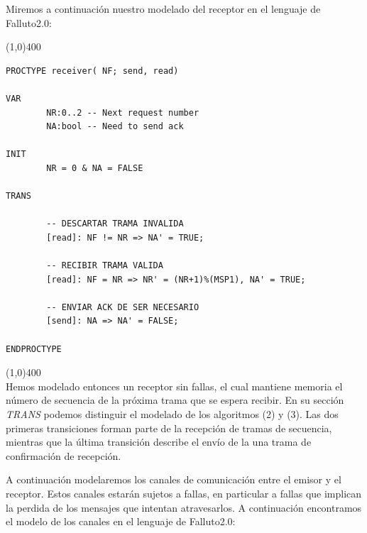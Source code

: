 \documentclass[titlepage, 12pt]{book}
\begin{document}
Miremos a continuaci\'on nuestro modelado del receptor en el lenguaje de Falluto2.0:

\noindent \line(1,0){400}
\begin{verbatim}
PROCTYPE receiver( NF; send, read)

VAR
        NR:0..2 -- Next request number
        NA:bool -- Need to send ack

INIT
        NR = 0 & NA = FALSE

TRANS

        -- DESCARTAR TRAMA INVALIDA
        [read]: NF != NR => NA' = TRUE;

        -- RECIBIR TRAMA VALIDA
        [read]: NF = NR => NR' = (NR+1)%(MSP1), NA' = TRUE;

        -- ENVIAR ACK DE SER NECESARIO
        [send]: NA => NA' = FALSE;

ENDPROCTYPE
\end{verbatim}
\noindent \line(1,0){400}\\

Hemos modelado entonces un receptor sin fallas, el cual mantiene memoria el n\'umero de secuencia de la pr\'oxima trama que se espera recibir. En su secci\'on \textit{TRANS} podemos distinguir el modelado de los algoritmos (2) y (3). Las dos primeras transiciones forman parte de la recepci\'on de tramas de secuencia, mientras que la \'ultima transici\'on describe el env\'io de la una trama de confirmaci\'on de recepci\'on.

A continuaci\'on modelaremos los canales de comunicaci\'on entre el emisor y el receptor. Estos canales estar\'an sujetos a fallas, en particular a fallas que implican la perdida de los mensajes que intentan atravesarlos. A continuaci\'on encontramos el modelo de los canales en el lenguaje de Falluto2.0:
\end{document}
